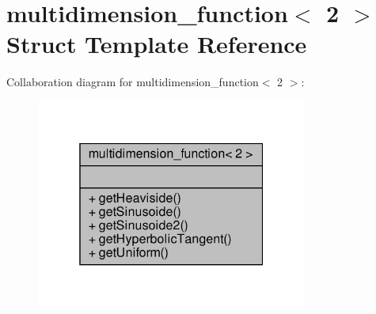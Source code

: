\hypertarget{structmultidimension__function_3_012_01_4}{}\section{multidimension\+\_\+function$<$ 2 $>$ Struct Template Reference}
\label{structmultidimension__function_3_012_01_4}


Collaboration diagram for multidimension\+\_\+function$<$ 2 $>$\+:\nopagebreak
\begin{figure}[H]
\begin{center}
\leavevmode
\includegraphics[width=253pt]{structmultidimension__function_3_012_01_4__coll__graph}
\end{center}
\end{figure}
